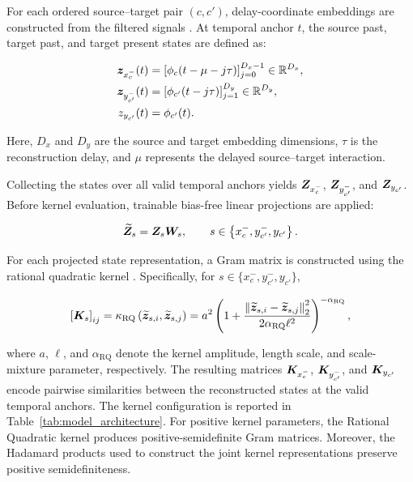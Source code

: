 For each ordered source--target pair $(c,c')$, delay-coordinate embeddings are constructed from the filtered signals \cite{takens1981detecting}. At temporal anchor $t$, the source past, target past, and target present states are
defined as:

\begin{align}
    {\bm{z}}_{x_c^{-}}(t)
    &=
    \left[
        \phi_c(t-\mu-j\tau)
    \right]_{j=0}^{D_x-1}
    \in\mathbb{R}^{D_x},
    \\
    {\bm{z}}_{y_{c'}^{-}}(t)
    &=
    \left[
        \phi_{c'}(t-j\tau)
    \right]_{j=1}^{D_y}
    \in\mathbb{R}^{D_y},
    \\
    z_{y_{c'}}(t)
    &=
    \phi_{c'}(t).
\end{align}

Here, $D_x$ and $D_y$ are the source and target embedding dimensions, $\tau$ is the reconstruction delay, and $\mu$ represents the delayed source--target interaction.

Collecting the states over all valid temporal anchors yields ${\bm{Z}}_{x_c^{-}}$, ${\bm{Z}}_{y_{c'}^{-}}$, and ${\bm{Z}}_{y_{c'}}$. Before kernel evaluation, trainable bias-free
linear projections are applied:

\begin{equation}
    \widetilde{{\bm{Z}}}_{s}
    =
    {\bm{Z}}_{s}{\bm{W}}_{s},
    \qquad
    s\in
    \left\{
        x_c^{-},y_{c'}^{-},y_{c'}
    \right\}.
\end{equation}

For each projected state representation, a Gram matrix is constructed using the rational quadratic kernel \cite{rasmussen2006gaussian}. Specifically, for $s\in\{x_c^{-},y_{c'}^{-},y_{c'}\}$,

\begin{equation}
    \left[{\bm{K}}_{s}\right]_{ij}
    =
    \kappa_{\mathrm{RQ}}
    \left(
        \widetilde{{\bm{z}}}_{s,i},
        \widetilde{{\bm{z}}}_{s,j}
    \right)
    =
    a^{2}
    \left(
        1+
        \frac{
            \left\|
                \widetilde{{\bm{z}}}_{s,i}
                -
                \widetilde{{\bm{z}}}_{s,j}
            \right\|_{2}^{2}
        }{
            2\alpha_{\mathrm{RQ}}\ell^{2}
        }
    \right)^{-\alpha_{\mathrm{RQ}}},
\end{equation}

where $a$, $\ell$, and $\alpha_{\mathrm{RQ}}$ denote the kernel amplitude, length scale, and scale-mixture parameter, respectively.
The resulting matrices
${\bm{K}}_{x_c^{-}}$, ${\bm{K}}_{y_{c'}^{-}}$, and ${\bm{K}}_{y_{c'}}$ encode pairwise similarities between the reconstructed states at the valid temporal anchors. The kernel configuration is reported in Table~\ref{tab:model_architecture}.
{For positive kernel parameters, the Rational Quadratic kernel produces positive-semidefinite Gram matrices. Moreover, the Hadamard products used to construct the joint kernel representations preserve positive semidefiniteness.}

